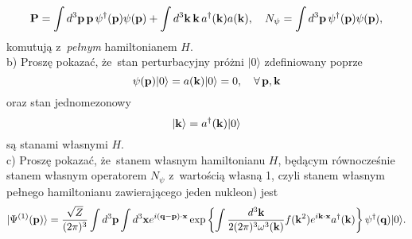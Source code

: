 \documentclass[a4paper,11pt]{article}
\begin{document}
\begin{enumerate}
\begin{equation}
    \mathbf{P}
    =
    \int d^{ 3 } \mathbf{p} \, \mathbf{p} \, \psi^{ \dagger }( \mathbf{p} )
    \psi( \mathbf{p} )
    + \int d^{ 3 } \mathbf{k} \, \mathbf{k} \, a^{ \dagger }( \mathbf{k} )
    a( \mathbf{k} ), \quad
    N_{ \psi } = \int d^{ 3 } \mathbf{p} \, \psi^{ \dagger }( \mathbf{p} ) \psi( \mathbf{p} ),
  \end{equation}
  komutują z~\emph{pełnym} hamiltonianem $H$. \\
  b) Proszę pokazać, że~stan perturbacyjny próżni $| 0 \rangle$ zdefiniowany
  poprze
  \begin{equation}
    \label{eq:8}
    \psi( \mathbf{p} ) | 0 \rangle = a( \mathbf{k} ) | 0 \rangle = 0, \quad
    \forall \, \mathbf{p}, \mathbf{k}
  \end{equation}
  oraz stan jednomezonowy
  \begin{equation}
    \label{eq:9}
    | \mathbf{k} \rangle = a^{ \dagger }( \mathbf{k} ) | 0 \rangle
  \end{equation}
  są stanami własnymi $H$. \\
  c) Proszę pokazać, że~stanem własnym hamiltonianu $H$, będącym
  równocześnie stanem własnym operatorem $N_{ \psi }$ z~wartością własną
  1, czyli stanem własnym pełnego hamiltonianu zawierającego jeden
  nukleon) jest
  \begin{equation}
    \label{eq:10}
    | \Psi^{ ( 1 ) }( \mathbf{p} ) \rangle
    =
    \frac{ \sqrt{ Z } }{ ( 2\pi )^{ 3 } }
    \int d^{ 3 } \mathbf{p} \int d^{ 3 } \mathbf{x}
    e^{ i ( \mathbf{q} - \mathbf{p} ) \cdot \mathbf{x} }
    \exp \left\{ \int \frac{ d^{ 3 } \mathbf{k} }{ 2 ( 2\pi )^{ 3 }
        \omega^{ 3 }( \mathbf{k} ) } f( \mathbf{k}^{ 2 } )
      e^{ i \mathbf{k} \cdot \mathbf{x} } a^{ \dagger }( \mathbf{k} ) \right\}
    \psi^{ \dagger }( \mathbf{q} ) | 0 \rangle.
  \end{equation}










\end{enumerate}
\end{document}
